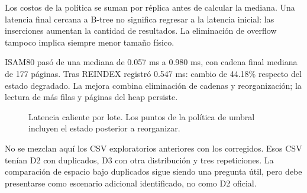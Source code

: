 \documentclass[11pt,a4paper]{article}
\begin{document}
Los costos de la política se suman por réplica antes de calcular la mediana.
Una latencia final cercana a B-tree no significa regresar a la latencia inicial:
las inserciones aumentan la cantidad de resultados. La eliminación de overflow
tampoco implica siempre menor tamaño físico.

ISAM80 pasó de una mediana de 0.057 ms a 0.980 ms, con cadena final mediana
de 177 páginas. Tras REINDEX registró 0.547 ms: cambio de 44.18\% respecto
del estado degradado. La mejora combina eliminación de cadenas y reorganización;
la lectura de más filas y páginas del heap persiste.

\begin{figure}[htbp]
\centering
{}
\caption{Latencia caliente por lote. Los puntos de la política de umbral incluyen
el estado posterior a reorganizar.}
\end{figure}

\clearpage

No se mezclan aquí los CSV exploratorios anteriores con los corregidos. Esos
CSV tenían D2 con duplicados, D3 con otra distribución y tres repeticiones. La
comparación de espacio bajo duplicados sigue siendo una pregunta útil, pero
debe presentarse como escenario adicional identificado, no como D2 oficial.
\end{document}
